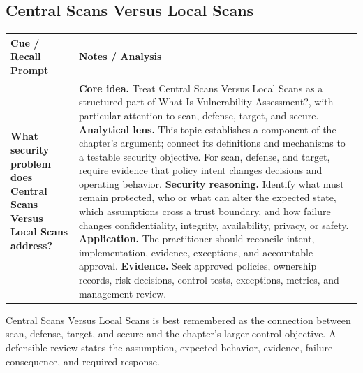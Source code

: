 \documentclass[11pt]{article}
\newcommand{\CornellHeader}{%
\rowcolor{Navy}\color{white}\bfseries Cue / Recall Prompt & \color{white}\bfseries Notes / Analysis\\\hline}
\newcommand{\CornellRow}[2]{%
\cellcolor{CueGray}\RaggedRight\textbf{#1} & \RaggedRight #2\\\hline}
\begin{document}
\subsection*{Central Scans Versus Local Scans}
\begin{longtable}{>{\RaggedRight\arraybackslash}p{}|>{\RaggedRight\arraybackslash}p{}}
\CornellHeader
\CornellRow{What security problem does Central Scans Versus Local Scans address?}{\textbf{Core idea.} Treat Central Scans Versus Local Scans as a structured part of What Is Vulnerability Assessment?, with particular attention to scan, defense, target, and secure. \textbf{Analytical lens.} This topic establishes a component of the chapter's argument; connect its definitions and mechanisms to a testable security objective. For scan, defense, and target, require evidence that policy intent changes decisions and operating behavior. \textbf{Security reasoning.} Identify what must remain protected, who or what can alter the expected state, which assumptions cross a trust boundary, and how failure changes confidentiality, integrity, availability, privacy, or safety. \textbf{Application.} The practitioner should reconcile intent, implementation, evidence, exceptions, and accountable approval. \textbf{Evidence.} Seek approved policies, ownership records, risk decisions, control tests, exceptions, metrics, and management review.}
\end{longtable}
\begin{topicsummary}
Central Scans Versus Local Scans is best remembered as the connection between scan, defense, target, and secure and the chapter's larger control objective. A defensible review states the assumption, expected behavior, evidence, failure consequence, and required response.
\end{topicsummary}
\end{document}
